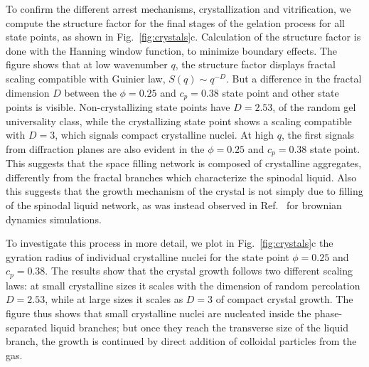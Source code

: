 \documentclass[twocolumn,superscriptaddress,showpacs,preprintnumbers,
amsmath,amssymb,prl]{revtex4-1}
\begin{document}
To confirm the different arrest mechanisms, crystallization and vitrification, we compute the structure factor for the final stages of the gelation process for all state points,
as shown in Fig.~\ref{fig:crystals}c. Calculation of the structure factor is done with the Hanning window function, to minimize boundary effects.
The figure shows that at low wavenumber $q$, the structure factor displays fractal scaling compatible with Guinier law, $S(q)\sim q^{-D}$. But a difference
in the fractal dimension $D$ between the $\phi=0.25$ and $c_p=0.38$ state point and other state points is visible. Non-crystallizing state
points have $D=2.53$, of the random gel universality class, while the crystallizing state point shows a scaling compatible with $D=3$, which
signals compact crystalline nuclei. At high $q$, the first signals from diffraction planes are also evident in the $\phi=0.25$ and $c_p=0.38$ state
point. This suggests that the space filling network is composed of crystalline aggregates, differently from the fractal branches which characterize the
spinodal liquid. Also this suggests that the growth mechanism of the crystal is not simply due to filling of the spinodal liquid network, as was
instead observed in Ref.~\cite{fortini2008crystallization,perez2011pathways} for brownian dynamics simulations.

To investigate this process in more detail, we plot in Fig.~\ref{fig:crystals}c the gyration radius of individual crystalline nuclei for the state point
$\phi=0.25$ and $c_p=0.38$. The results show that the crystal growth follows two different scaling laws: at small crystalline sizes it scales with
the dimension of random percolation $D=2.53$, while at large sizes it scales as $D=3$ of compact crystal growth. The figure thus shows that
small crystalline nuclei are nucleated inside the phase-separated liquid branches; but once they reach the transverse size of the liquid branch, the growth is continued
by direct addition of colloidal particles from the gas.
\end{document}
